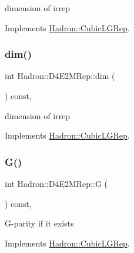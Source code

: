 dimension of irrep 

Implements \mbox{\hyperlink{structHadron_1_1CubicLGRep_a3acbaea26503ed64f20df693a48e4cdd}{Hadron\+::\+Cubic\+L\+G\+Rep}}.

\mbox{\label{structHadron_1_1D4E2MRep_a278a8c15aa90f5ca19d3ed547d94ed45}} 
\subsubsection{\texorpdfstring{dim()}{dim()}\hspace{0.1cm}{\footnotesize\ttfamily [2/2]}}
{\footnotesize\ttfamily int Hadron\+::\+D4\+E2\+M\+Rep\+::dim (\begin{DoxyParamCaption}{ }\end{DoxyParamCaption}) const\hspace{0.3cm}{\ttfamily [inline]}, {\ttfamily [virtual]}}

dimension of irrep 

Implements \mbox{\hyperlink{structHadron_1_1CubicLGRep_a3acbaea26503ed64f20df693a48e4cdd}{Hadron\+::\+Cubic\+L\+G\+Rep}}.

\mbox{\label{structHadron_1_1D4E2MRep_a8864f10fd71c4df8470c772f597564f6}} 
\subsubsection{\texorpdfstring{G()}{G()}\hspace{0.1cm}{\footnotesize\ttfamily [1/2]}}
{\footnotesize\ttfamily int Hadron\+::\+D4\+E2\+M\+Rep\+::G (\begin{DoxyParamCaption}{ }\end{DoxyParamCaption}) const\hspace{0.3cm}{\ttfamily [inline]}, {\ttfamily [virtual]}}

G-\/parity if it exists 

Implements \mbox{\hyperlink{structHadron_1_1CubicLGRep_ace26f7b2d55e3a668a14cb9026da5231}{Hadron\+::\+Cubic\+L\+G\+Rep}}.

\mbox{\label{structHadron_1_1D4E2MRep_a8864f10fd71c4df8470c772f597564f6}} 
